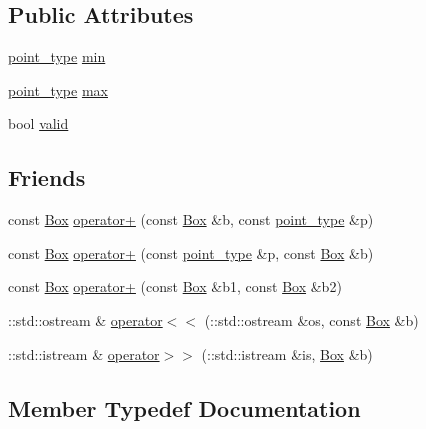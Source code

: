 \subsection*{Public Attributes}
\begin{DoxyCompactItemize}
\item 
\hyperlink{classtrimesh_1_1Box_a208c806781f96a7001491a275dfa7655}{point\+\_\+type} \hyperlink{classtrimesh_1_1Box_a58c2da25c281e02ddc987c157e666517}{min}
\item 
\hyperlink{classtrimesh_1_1Box_a208c806781f96a7001491a275dfa7655}{point\+\_\+type} \hyperlink{classtrimesh_1_1Box_a845e5f1648b55bd35607e9dcb09a9a92}{max}
\item 
bool \hyperlink{classtrimesh_1_1Box_a388cbaca80a84b13ed434835a470b70c}{valid}
\end{DoxyCompactItemize}
\subsection*{Friends}
\begin{DoxyCompactItemize}
\item 
const \hyperlink{classtrimesh_1_1Box}{Box} \hyperlink{classtrimesh_1_1Box_a23d724d489cba7bb23565790189fb659}{operator+} (const \hyperlink{classtrimesh_1_1Box}{Box} \&b, const \hyperlink{classtrimesh_1_1Box_a208c806781f96a7001491a275dfa7655}{point\+\_\+type} \&p)
\item 
const \hyperlink{classtrimesh_1_1Box}{Box} \hyperlink{classtrimesh_1_1Box_ad2d14571fddd30993d281b575b02a7be}{operator+} (const \hyperlink{classtrimesh_1_1Box_a208c806781f96a7001491a275dfa7655}{point\+\_\+type} \&p, const \hyperlink{classtrimesh_1_1Box}{Box} \&b)
\item 
const \hyperlink{classtrimesh_1_1Box}{Box} \hyperlink{classtrimesh_1_1Box_a3bde7aa47ecb941209e87db7d3fe2e70}{operator+} (const \hyperlink{classtrimesh_1_1Box}{Box} \&b1, const \hyperlink{classtrimesh_1_1Box}{Box} \&b2)
\item 
\+::std\+::ostream \& \hyperlink{classtrimesh_1_1Box_a2b5e011ce3527b8f40eb42c351bf24e9}{operator$<$$<$} (\+::std\+::ostream \&os, const \hyperlink{classtrimesh_1_1Box}{Box} \&b)
\item 
\+::std\+::istream \& \hyperlink{classtrimesh_1_1Box_a33a4dca895ab5620960e259681995093}{operator$>$$>$} (\+::std\+::istream \&is, \hyperlink{classtrimesh_1_1Box}{Box} \&b)
\end{DoxyCompactItemize}


\subsection{Member Typedef Documentation}
\mbox{\label{classtrimesh_1_1Box_a9a9725eafb98d3340e22db0f9be77068}} 

